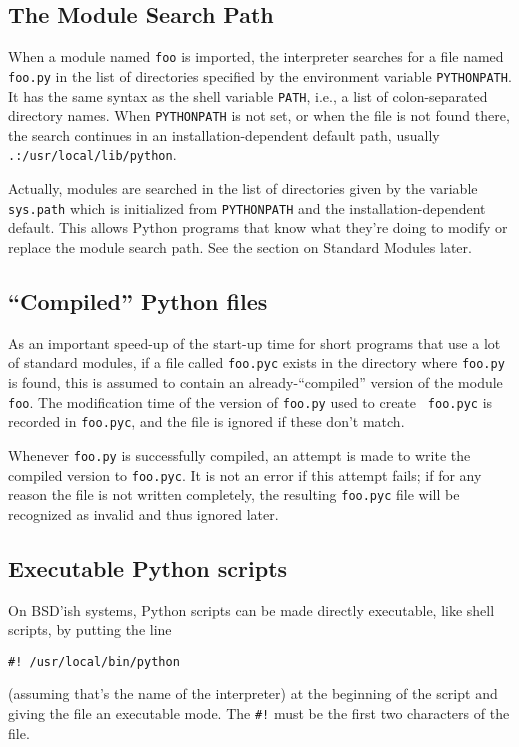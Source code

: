 \subsection{The Module Search Path}

When a module named {\tt foo} is imported, the interpreter searches
for a file named {\tt foo.py} in the list of directories specified by
the environment variable {\tt PYTHONPATH}.  It has the same syntax as
the {\UNIX} shell variable {\tt PATH}, i.e., a list of colon-separated
directory names.  When {\tt PYTHONPATH} is not set, or when the file
is not found there, the search continues in an installation-dependent
default path, usually {\tt .:/usr/local/lib/python}.

Actually, modules are searched in the list of directories given by the
variable {\tt sys.path} which is initialized from {\tt PYTHONPATH} and
the installation-dependent default.  This allows Python programs that
know what they're doing to modify or replace the module search path.
See the section on Standard Modules later.

\subsection{``Compiled'' Python files}

As an important speed-up of the start-up time for short programs that
use a lot of standard modules, if a file called {\tt foo.pyc} exists
in the directory where {\tt foo.py} is found, this is assumed to
contain an already-``compiled'' version of the module {\tt foo}.  The
modification time of the version of {\tt foo.py} used to create {\tt
foo.pyc} is recorded in {\tt foo.pyc}, and the file is ignored if
these don't match.

Whenever {\tt foo.py} is successfully compiled, an attempt is made to
write the compiled version to {\tt foo.pyc}.  It is not an error if
this attempt fails; if for any reason the file is not written
completely, the resulting {\tt foo.pyc} file will be recognized as
invalid and thus ignored later.

\subsection{Executable Python scripts}

On BSD'ish {\UNIX} systems, Python scripts can be made directly
executable, like shell scripts, by putting the line

\bcode\begin{verbatim}
#! /usr/local/bin/python
\end{verbatim}\ecode
%
(assuming that's the name of the interpreter) at the beginning of the
script and giving the file an executable mode.  The {\tt \#!} must be
the first two characters of the file.


